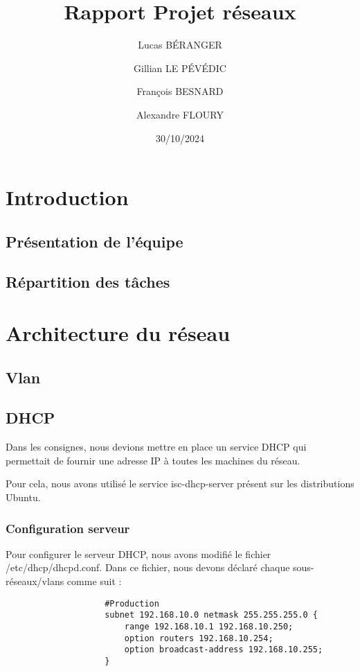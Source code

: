 \documentclass[a4paper,12pt]{report}
\title{Rapport Projet réseaux}
\author{
    Lucas BÉRANGER \and
    Gillian LE PÉVÉDIC \and
    François BESNARD \and
    Alexandre FLOURY \and
}
\date{30/10/2024}
\begin{document}
    \maketitle  
    \newpage

    \tableofcontents
    \newpage

    \chapter{Introduction}
        \section{Présentation de l'équipe}
        \section{Répartition des tâches}


    \chapter{Architecture du réseau}
        \section{Vlan}
        \section{DHCP}
            Dans les consignes, nous devions mettre en place un service DHCP qui permettait de fournir une adresse IP à toutes les machines du réseau. 
            
            Pour cela, nous avons utilisé le service isc-dhcp-server présent sur les distributions Ubuntu.
            \subsection{Configuration serveur}
                Pour configurer le serveur DHCP, nous avons modifié le fichier /etc/dhcp/dhcpd.conf. 
                Dans ce fichier, nous devons déclaré chaque sous-réseaux/vlans comme suit :
                
                    \begin{verbatim}
                    #Production
                    subnet 192.168.10.0 netmask 255.255.255.0 {
                        range 192.168.10.1 192.168.10.250;
                        option routers 192.168.10.254;
                        option broadcast-address 192.168.10.255;
                    }
                    \end{verbatim}
                
\end{document}
